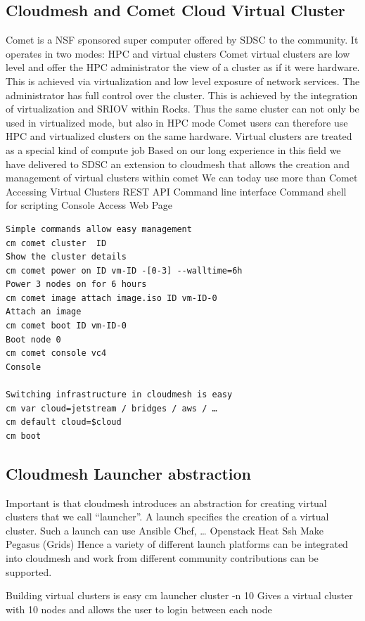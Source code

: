 \subsection{Cloudmesh and Comet Cloud Virtual Cluster}
Comet is a NSF sponsored super computer offered by SDSC to the community. It operates in two modes: HPC and virtual clusters
Comet virtual clusters are low level and offer the HPC administrator the view of a cluster as if it were hardware. This is achieved via virtualization and low level exposure of network services. The administrator has full control over the cluster.
This is achieved by the integration of virtualization and SRIOV within Rocks. Thus the same cluster can not only be used in virtualized mode, but also in HPC mode
Comet users can therefore use HPC and virtualized clusters on the same hardware. Virtual clusters are treated as a special kind of compute job
Based on our long experience in this field we have delivered to SDSC an extension to cloudmesh that allows the creation and management of virtual clusters within comet
We can today use more than Comet
Accessing Virtual Clusters
REST API
Command line interface
Command shell for scripting
Console Access
Web Page

\begin{verbatim}
Simple commands allow easy management
cm comet cluster  ID
Show the cluster details
cm comet power on ID vm-ID -[0-3] --walltime=6h
Power 3 nodes on for 6 hours
cm comet image attach image.iso ID vm-ID-0
Attach an image
cm comet boot ID vm-ID-0
Boot node 0
cm comet console vc4
Console 

Switching infrastructure in cloudmesh is easy
cm var cloud=jetstream / bridges / aws / …
cm default cloud=$cloud
cm boot
\end{verbatim}

\subsection{Cloudmesh Launcher abstraction}
Important is that cloudmesh introduces an abstraction for creating virtual clusters that we call “launcher”. A launch specifies the creation of a virtual cluster. Such a launch can use
Ansible
Chef, …
Openstack Heat
Ssh
Make
Pegasus (Grids)
Hence a variety of different launch platforms can be integrated into cloudmesh and work from different community contributions can be supported.

Building virtual clusters is easy
cm launcher cluster -n 10
Gives a virtual cluster with 10 nodes and allows the user to login between each node


